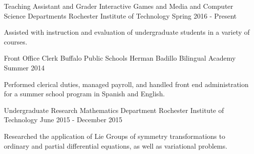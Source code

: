 


\begin{cventries}


\cventry
{Teaching Assistant and Grader} %
{Interactive Games and Media and Computer Science Departments} %
{Rochester Institute of Technology} %
{Spring 2016 - Present} %
{ %
\begin{cvitems}
\item {Assisted with instruction and evaluation of undergraduate students in a variety of courses.}
\end{cvitems}
}




\cventry
{Front Office Clerk} %
{Buffalo Public Schools} %
{Herman Badillo Bilingual Academy} %
{Summer 2014} %
{ %
\begin{cvitems}
\item {Performed clerical duties, managed payroll, and handled front end administration for a summer school program in Spanish and English.}
\end{cvitems} 
}


\cventry
{Undergraduate Research} %
{Mathematics Department} %
{Rochester Institute of Technology} %
{June 2015 - December 2015} %
{ %
\begin{cvitems}
\item {Researched the application of Lie Groups of symmetry transformations to ordinary and partial differential equations, as well as variational problems.}
\end{cvitems}
}


\end{cventries}
